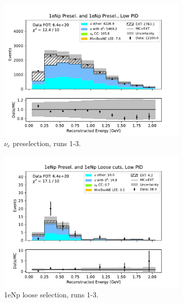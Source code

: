 \begin{figure}[H]
    \centering
    \begin{subfigure}{0.5\linewidth}
        \includegraphics[width=\linewidth]{technote/Sidebands/Figures/FarSideband/far_sideband_reco_e_run123_NP_NP_LOW_PID.pdf}
        \caption{$\nu_e$ preselection, runs 1-3.}
    \end{subfigure}%
    \begin{subfigure}{0.5\linewidth}
        \includegraphics[width=\linewidth]{technote/Sidebands/Figures/FarSideband/far_sideband_reco_e_run123_NP_NPL_LOW_PID.pdf}
        \caption{1eNp loose selection, runs 1-3.}
    \end{subfigure}
    \begin{subfigure}{0.5\linewidth}

\end{subfigure}
\end{figure}
